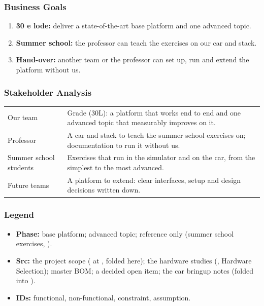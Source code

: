 \documentclass[11pt,a4paper]{article}
\begin{document}
\subsubsection{Business Goals}
\begin{enumerate}
  \item \textbf{30 e lode:} deliver a state-of-the-art base platform and one advanced topic.
  \item \textbf{Summer school:} the professor can teach the exercises on our car and stack.
  \item \textbf{Hand-over:} another team or the professor can set up, run and extend the platform without us.
\end{enumerate}

\subsubsection{Stakeholder Analysis}
\begin{tabularx}{\textwidth}{@{}L{3.5cm} Y@{}}
\toprule
{} &  \\
\midrule
Our team & Grade (30L): a platform that works end to end and one advanced topic that measurably improves on it. \\
Professor & A car and stack to teach the summer school exercises on; documentation to run it without us. \\
Summer school students & Exercises that run in the simulator and on the car, from the simplest to the most advanced. \\
Future teams & A platform to extend: clear interfaces, setup and design decisions written down. \\
\bottomrule
\end{tabularx}

\subsubsection{Legend}
\begin{itemize}
  \item \textbf{Phase:}  base platform;  advanced topic;  reference only (summer school exercises, \tbd[OI-12]).
  \item \textbf{Src:}  the project scope ( at , folded here);  the hardware studies (, Hardware Selection);  master BOM;  a decided open item;  the car bringup notes (folded into ).
  \item \textbf{IDs:}  functional,  non-functional,  constraint,  assumption.
\end{itemize}
\end{document}
